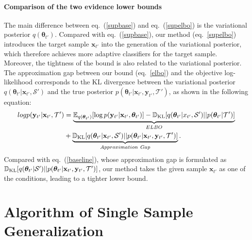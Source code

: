 \documentclass{article} \usepackage[table]{xcolor}
\newcommand{\x}{\mathbf{x}}
\newcommand{\y}{\mathbf{y}}
\newcommand{\btheta}{\boldsymbol{\theta}}
\begin{document}
\paragraph{Comparison of the two evidence lower bounds}
The main difference between eq.~(\ref{supbase}) and eq.~(\ref{supelbo}) is the variational posterior $q(\btheta_{t'})$.
Compared with eq.~(\ref{supbase}), our method (eq.~\ref{supelbo}) introduces the target sample $\x_{t'}$ into the generation of the variational posterior, which therefore achieves more adaptive classifiers for the target sample.
Moreover, the tightness of the bound is also related to the variational posterior.
The approximation gap between our bound (eq.~\ref{elbo}) and the objective log-likelihood corresponds to the KL divergence between the variational posterior $q(\btheta_{t'}|\x_{t'}, \mathcal{S'})$ and the true posterior $p(\btheta_{t'}|\x_{t'},\y_{t'}, \mathcal{T'})$, as shown in the following equation: 
\begin{equation}
\begin{aligned}
    log p(\y_{t'}|\x_{t'}, \mathcal{T'}) & = \underbrace{ \mathbb{E}_{q(\btheta_{t'})} [\log p(\y_{t'}|\x_{t'}, \btheta_{t'})] - \mathbb{D}_{\rm{KL}}[q(\btheta_{t'}|x_{t'}, \mathcal{S'}) || p(\btheta_{t'}|\mathcal{T'})]}_{ELBO} \\
    & + \underbrace{\mathbb{D}_{\rm{KL}} [q(\btheta_{t'}|\x_{t'}, \mathcal{S'}) || p(\btheta_{t'}|\x_{t'},\y_{t'}, \mathcal{T'})]}_{Approximation~Gap}.
\end{aligned}
\end{equation}
Compared with eq.~(\ref{baseline}), whose approximation gap is formulated as $\mathbb{D}_{\rm{KL}} [q(\btheta_{t'}|\mathcal{S'}) || p(\btheta_{t'}|\x_{t'},\y_{t'}, \mathcal{T'})]$, our method takes the given sample $\x_{t'}$ as one of the conditions, leading to a tighter lower bound.


\section{Algorithm of Single Sample Generalization}
\label{algorithm}
\end{document}

